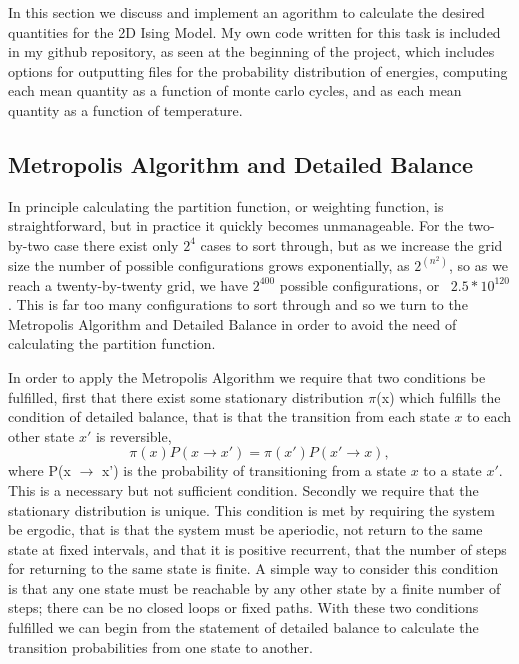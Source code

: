 \documentclass[11pt,a4paper]{article}
\begin{document}
In this section we discuss and implement an agorithm to calculate the desired quantities for the 2D Ising Model. My own code written for this task is included in my github repository, as seen at the beginning of the project, which includes options for outputting files for the probability distribution of energies, computing each mean quantity as a function of monte carlo cycles, and as each mean quantity as a function of temperature.

\subsection{Metropolis Algorithm and Detailed Balance}

In principle calculating the partition function, or weighting function, is straightforward, but in practice it quickly becomes unmanageable. For the two-by-two case there exist only $2^4$ cases to sort through, but as we increase the grid size the number of possible configurations grows exponentially, as $2^{(n^2)}$, so as we reach a twenty-by-twenty grid, we have $2^{400}$ possible configurations, or ~$2.5*10^{120}$. This is far too many configurations to sort through and so we turn to the Metropolis Algorithm and Detailed Balance in order to avoid the need of calculating the partition function.

In order to apply the Metropolis Algorithm we require that two conditions be fulfilled, first that there exist some stationary distribution $\pi$(x) which fulfills the condition of detailed balance, that is that the transition from each state $x$ to each other state $x'$ is reversible,
\begin{equation}
\pi(x)P(x \rightarrow x') = \pi(x')P(x'\rightarrow x),
\end{equation}
where P(x $\rightarrow$ x') is the probability of transitioning from a state $x$ to a state $x'$. This is a necessary but not sufficient condition. Secondly we require that the stationary distribution is unique. This condition is met by requiring the system be ergodic, that is that the system must be aperiodic, not return to the same state at fixed intervals, and that it is positive recurrent, that the number of steps for returning to the same state is finite. A simple way to consider this condition is that any one state must be reachable by any other state by a finite number of steps; there can be no closed loops or fixed paths. With these two conditions fulfilled we can begin from the statement of detailed balance to calculate the transition probabilities from one state to another.
\end{document}
